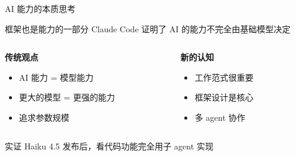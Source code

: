 \documentclass[aspectratio=169,xcolor=dvipsnames]{beamer}
\begin{document}
\begin{frame}{AI 能力的本质思考}
  \begin{block}{框架也是能力的一部分}
    Claude Code 证明了 AI 的能力不完全由基础模型决定
  \end{block}

  \vspace{0.3cm}

  \begin{columns}
    \begin{column}{0.48\textwidth}
      \textbf{传统观点}
      \begin{itemize}
        \item AI 能力 = 模型能力
        \item 更大的模型 = 更强的能力
        \item 追求参数规模
      \end{itemize}
    \end{column}
    \begin{column}{0.48\textwidth}
      \textbf{新的认知}
      \begin{itemize}
        \item 工作范式很重要
        \item 框架设计是核心
        \item 多 agent 协作
      \end{itemize}
    \end{column}
  \end{columns}

  \vspace{0.3cm}

  \begin{exampleblock}{实证}
    Haiku 4.5 发布后，看代码功能完全用子 agent 实现
  \end{exampleblock}
\end{frame}
\end{document}
